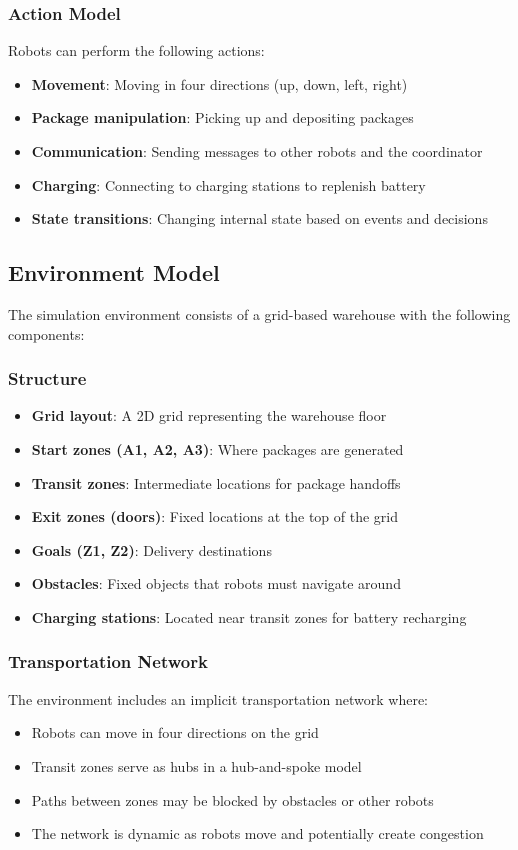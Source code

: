 \documentclass[12pt,a4paper]{article}
\begin{document}
\subsubsection{Action Model}
Robots can perform the following actions:
\begin{itemize}
    \item \textbf{Movement}: Moving in four directions (up, down, left, right)
    \item \textbf{Package manipulation}: Picking up and depositing packages
    \item \textbf{Communication}: Sending messages to other robots and the coordinator
    \item \textbf{Charging}: Connecting to charging stations to replenish battery
    \item \textbf{State transitions}: Changing internal state based on events and decisions
\end{itemize}

\subsection{Environment Model}
The simulation environment consists of a grid-based warehouse with the following components:

\subsubsection{Structure}
\begin{itemize}
    \item \textbf{Grid layout}: A 2D grid representing the warehouse floor
    \item \textbf{Start zones (A1, A2, A3)}: Where packages are generated
    \item \textbf{Transit zones}: Intermediate locations for package handoffs
    \item \textbf{Exit zones (doors)}: Fixed locations at the top of the grid
    \item \textbf{Goals (Z1, Z2)}: Delivery destinations
    \item \textbf{Obstacles}: Fixed objects that robots must navigate around
    \item \textbf{Charging stations}: Located near transit zones for battery recharging
\end{itemize}

\subsubsection{Transportation Network}
The environment includes an implicit transportation network where:
\begin{itemize}
    \item Robots can move in four directions on the grid
    \item Transit zones serve as hubs in a hub-and-spoke model
    \item Paths between zones may be blocked by obstacles or other robots
    \item The network is dynamic as robots move and potentially create congestion
\end{itemize}
\end{document}
